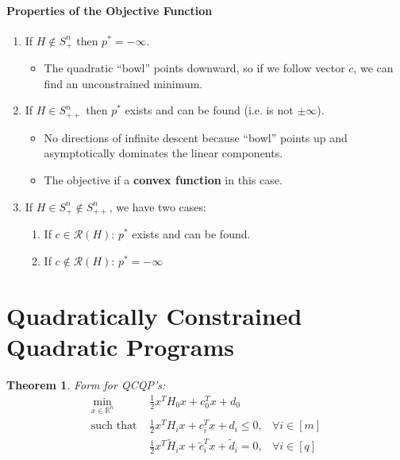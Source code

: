 \documentclass[a4paper,12pt]{report}
\newtheorem{theorem}{Theorem}
\begin{document}
\paragraph{Properties of the Objective Function} 
\begin{enumerate}
\item If $H \notin S_+^n$ then $p^* = -\infty$.
\begin{itemize}
\item The quadratic ``bowl'' points downward, so if we follow vector $c$, we can find an unconstrained minimum.
\end{itemize}

\item If $H\in S_{++}^n$ then $p^*$ exists and can be found (i.e. is not $\pm \infty$).
\begin{itemize}
\item No directions of infinite descent because ``bowl'' points up and asymptotically dominates the linear components.
\item The objective if a \textbf{convex function} in this case. 
\end{itemize}

\item If $H\in S_+^n \notin S_{++}^n$, we have two cases:
\begin{enumerate}
\item If $c\in \mathcal{R}(H)$: $p^*$ exists and can be found.
\item If $c\notin \mathcal{R}(H)$: $p^* = -\infty$ 
\end{enumerate}
\end{enumerate}


\section{Quadratically Constrained Quadratic Programs}

\begin{theorem}{Form for QCQP's: }
\begin{align}
\min_{x\in \mathbb{R}^n} & \frac{1}{2} x^T H_0 x + c_0^T x + d_0 \\
\text{such that }& \frac{1}{2} x^T H_i x + c_i^T x + d_i \leq 0, & \forall i\in [m] \\
& \frac{1}{2} x^T \tilde H_i x + \tilde c_i^T x + \tilde d_i = 0, & \forall i\in [q] \\
\end{align}
\end{theorem}
\end{document}
